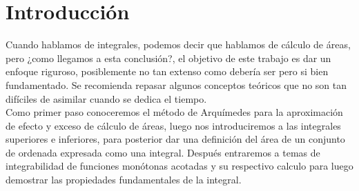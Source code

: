 \section*{Introducción}
Cuando hablamos de integrales, podemos decir que hablamos de cálculo de áreas, pero ¿como llegamos a esta conclusión?, el objetivo de este trabajo es dar un enfoque riguroso, posiblemente no tan extenso como debería ser pero si bien fundamentado. Se recomienda repasar algunos conceptos teóricos que no son tan difíciles de asimilar cuando se dedica el tiempo. \\

Como primer paso conoceremos el método de Arquímedes para la aproximación de efecto y exceso de cálculo de áreas, luego nos introduciremos a las integrales superiores e inferiores, para posterior dar una definición del área de un conjunto de ordenada expresada como una integral. Después entraremos a temas de integrabilidad de funciones monótonas acotadas y su respectivo calculo para luego demostrar las propiedades fundamentales de la integral.\\\\

